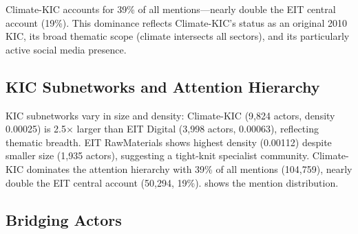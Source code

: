 \documentclass[../main.tex]{subfiles}
\begin{document}
\begin{insightbox}
Climate-KIC accounts for 39\% of all mentions---nearly double the EIT central account (19\%). This dominance reflects Climate-KIC's status as an original 2010 KIC, its broad thematic scope (climate intersects all sectors), and its particularly active social media presence.
\end{insightbox}

\subsection{KIC Subnetworks and Attention Hierarchy}

KIC subnetworks vary in size and density: Climate-KIC (9,824 actors, density 0.00025) is 2.5$\times$ larger than EIT Digital (3,998 actors, 0.00063), reflecting thematic breadth. EIT RawMaterials shows highest density (0.00112) despite smaller size (1,935 actors), suggesting a tight-knit specialist community. Climate-KIC dominates the attention hierarchy with 39\% of all mentions (104,759), nearly double the EIT central account (50,294, 19\%).  shows the mention distribution.

\begin{center}
\end{center}

\subsection{Bridging Actors}
\end{document}
